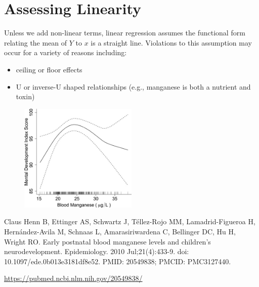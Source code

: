 \documentclass[
  letterpaper,
  DIV=11,
  numbers=noendperiod]{scrreport}
\providecommand{\tightlist}{%
  \setlength{\itemsep}{0pt}\setlength{\parskip}{0pt}}\usepackage{longtable,booktabs,array}
\begin{document}
\hypertarget{assessing-linearity}{%
\section{Assessing Linearity}\label{assessing-linearity}}

Unless we add non-linear terms, linear regression assumes the functional
form relating the mean of \(Y\) to \(x\) is a straight line. Violations
to this assumption may occur for a variety of reasons including:

\begin{itemize}
\tightlist
\item
  ceiling or floor effects
\item
  U or inverse-U shaped relationships (e.g., manganese is both a
  nutrient and toxin)
\end{itemize}

\begin{figure}

{\centering \includegraphics[width=0.5\textwidth,height=\textheight]{week4/images/manganese.jpeg}

}

\end{figure}

Claus Henn B, Ettinger AS, Schwartz J, Téllez-Rojo MM, Lamadrid-Figueroa
H, Hernández-Avila M, Schnaas L, Amarasiriwardena C, Bellinger DC, Hu H,
Wright RO. Early postnatal blood manganese levels and children's
neurodevelopment. Epidemiology. 2010 Jul;21(4):433-9. doi:
10.1097/ede.0b013e3181df8e52. PMID: 20549838; PMCID: PMC3127440.

\url{https://pubmed.ncbi.nlm.nih.gov/20549838/}
\end{document}

